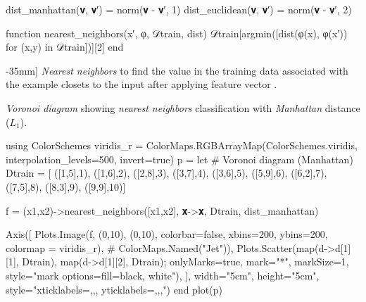 \begin{algorithm}
\begin{juliaverbatim}
dist_manhattan(𝐯, 𝐯′) = norm(𝐯 - 𝐯′, 1)
dist_euclidean(𝐯, 𝐯′) = norm(𝐯 - 𝐯′, 2)

function nearest_neighbors(x′, φ, 𝒟train, dist)
    𝒟train[argmin([dist(φ(x), φ(x′)) for (x,y) in 𝒟train])][2]
end
\end{juliaverbatim}

\caption[][-35mm]{
	\label{alg:nearest_neighbors}
	\textit{Nearest neighbors} to find the  value in the training data  associated with the example closets to the input  after applying feature vector .
}
\end{algorithm}


\begin{marginfigure}[-28mm]
\caption{
	\label{fig:voronoi_manhat} \textit{Voronoi diagram} showing \textit{nearest neighbors} classification with \textit{Manhattan} distance ($L_1$).
}
\begin{jlcode}
using ColorSchemes
viridis_r = ColorMaps.RGBArrayMap(ColorSchemes.viridis, interpolation_levels=500, invert=true)
p = let
	# Voronoi diagram (Manhattan)
	Dtrain = [
	    ([1,5],1), 
	    ([1,6],2), 
	    ([2,8],3), 
	    ([3,7],4), 
	    ([3,6],5), 
	    ([5,9],6), 
	    ([6,2],7),
	    ([7,5],8), 
	    ([8,3],9), 
	    ([9,9],10)]

	f = (x1,x2)->nearest_neighbors([x1,x2], 𝐱->𝐱, Dtrain, dist_manhattan) 

	Axis([
	    Plots.Image(f, (0,10), (0,10), colorbar=false, xbins=200, ybins=200, colormap = viridis_r), # ColorMaps.Named("Jet")),
	    Plots.Scatter(map(d->d[1][1], Dtrain), map(d->d[1][2], Dtrain); 
	        onlyMarks=true, mark="*", markSize=1, style="mark options={fill=black}, white"),
	], width="5cm", height="5cm", style="xticklabels={,,}, yticklabels={,,},")
end
plot(p)
\end{jlcode}
\begin{center}
\end{center}
\end{marginfigure}
